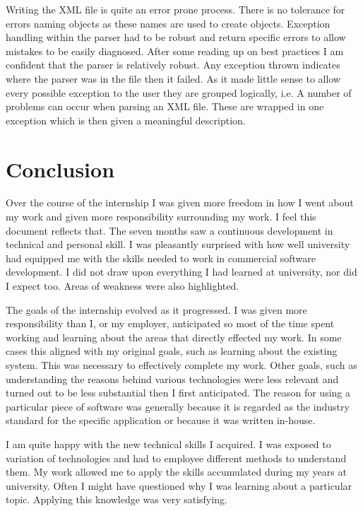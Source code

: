 \documentclass[a4paper, 11pt, titlepage]{article}
\begin{document}
Writing the XML file is quite an error prone process. There is no tolerance for errors naming objects as these names are used to create objects. Exception handling within the parser had to be robust and return specific errors to allow mistakes to be easily diagnosed. After some reading up on best practices I am confident that the parser is relatively robust. Any exception thrown indicates where the parser was in the file then it failed. As it made little sense to allow every possible exception to the user they are grouped logically, i.e. A number of problems can occur when parsing an XML file. These are wrapped in one exception which is then given a meaningful description. \cite{RobustJava}

\newpage
 
\section{Conclusion} 
 
Over the course of the internship I was given more freedom in how I went about my work and given more responsibility surrounding my work. I feel this document reflects that. The seven months saw a continuous development in technical and personal skill. I was pleasantly surprised with how well university had equipped me with the skills needed to work in commercial software development. I did not draw upon everything I had learned at university, nor did I expect too. Areas of weakness were also highlighted. 

The goals of the internship evolved as it progressed. I was given more responsibility than I, or my employer, anticipated so most of the time spent working and learning about the areas that directly effected my work. In some cases this aligned with my original goals, such as learning about the existing system. This was necessary to effectively complete my work. Other goals, such as understanding the reasons behind various technologies were less relevant and turned out to be less substantial then I first anticipated. The reason for using a particular piece of software was generally because it is regarded as the industry standard for the specific application or because it was written in-house.

I am quite happy with the new technical skills I acquired. I was exposed to variation of technologies and had to employee different methods to understand them. My work allowed me to apply the skills accumulated during my years at university. Often I might have questioned why I was learning about a particular topic. Applying this knowledge was very satisfying.
\end{document}
